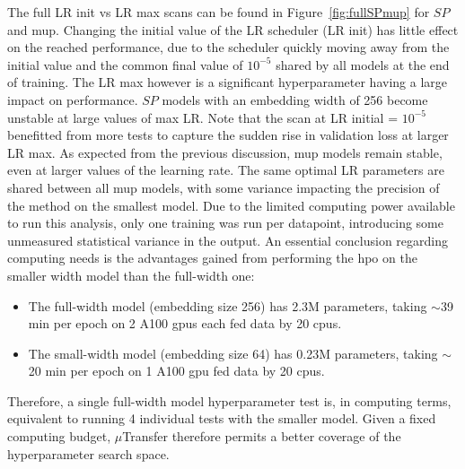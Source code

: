 The full LR init vs LR max scans can be found in Figure~\ref{fig:fullSPmup} for $SP$ and \gls{mup}. Changing the initial value of the LR scheduler (LR init) has little effect on the reached performance, due to the scheduler quickly moving away from the initial value and the common final value of $10^{-5}$ shared by all models at the end of training. The LR max however is a significant hyperparameter having a large impact on performance. $SP$ models with an embedding width of 256 become unstable at large values of max LR. Note that the scan at LR initial = $10^{-5}$ benefitted from more tests to capture the sudden rise in validation loss at larger LR max. As expected from the previous discussion, \gls{mup} models remain stable, even at larger values of the learning rate. The same optimal LR parameters are shared between all \gls{mup} models, with some variance impacting the precision of the method on the smallest model. Due to the limited computing power available to run this analysis, only one training was run per datapoint, introducing some unmeasured statistical variance in the output. An essential conclusion regarding computing needs is the advantages gained from performing the \gls{hpo} on the smaller width model than the full-width one:
\begin{itemize}
  \item The full-width model (embedding size 256) has 2.3M parameters, taking $\sim$39 min per epoch on 2 A100 \glspl{gpu} each fed data by 20 \glspl{cpu}.
  \item The small-width model (embedding size 64) has 0.23M parameters, taking $\sim$20 min per epoch on 1 A100 \gls{gpu} fed data by 20 \glspl{cpu}.
\end{itemize}
Therefore, a single full-width model hyperparameter test is, in computing terms, equivalent to running 4 individual tests with the smaller model. Given a fixed computing budget, $\mu$Transfer therefore permits a better coverage of the hyperparameter search space.\\

